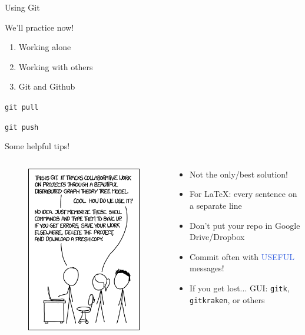 \documentclass[11pt,professionalfonts]{beamer}
\def\Emph{\textcolor{RoyalBlue}}
\begin{document}
\begin{frame}{Using Git}%


We'll practice now!

\begin{enumerate}
    \item Working alone
    \item Working with others
    \item Git and Github
\end{enumerate}

\texttt{git pull}

\texttt{git push}
\end{frame}%


\begin{frame}{Some helpful tips!}%
\begin{columns}
\begin{column}{0.5\textwidth}
\begin{figure}
    \includegraphics[height=0.75\textheight]{figures/git.png}
\end{figure}
\end{column}
\begin{column}{0.5\textwidth}
\begin{itemize}
    \item Not the only/best solution!
    \item For \LaTeX: every sentence on a separate line
    \item Don't put your repo in Google Drive/Dropbox
    \item Commit often with \Emph{USEFUL} messages!
    \item If you get lost... GUI: \texttt{gitk}, \texttt{gitkraken}, or others
\end{itemize}
\end{column}
\end{columns}
\end{frame}%
\end{document}
